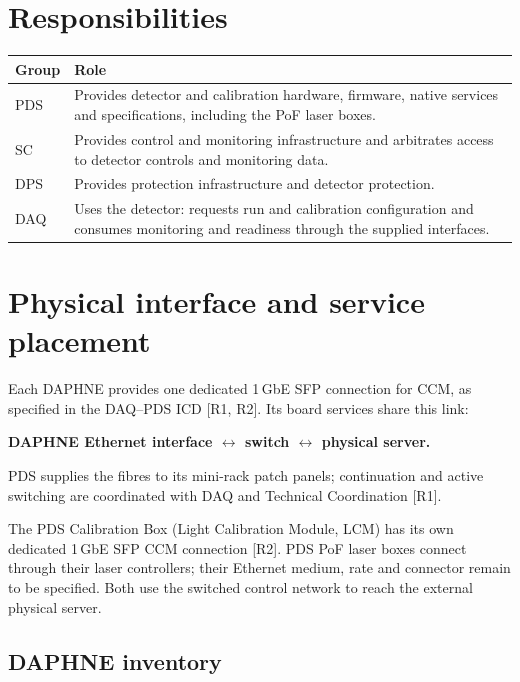 \section{Responsibilities}

\begin{center}\small
\begin{tabular}{L{0.12\textwidth}L{0.81\textwidth}}
\toprule
\textbf{Group} & \textbf{Role} \\
\midrule
PDS & Provides detector and calibration hardware, firmware, native services and specifications, including the PoF laser boxes. \\
SC & Provides control and monitoring infrastructure and arbitrates access to detector controls and monitoring data. \\
DPS & Provides protection infrastructure and detector protection. \\
DAQ & Uses the detector: requests run and calibration configuration and consumes monitoring and readiness through the supplied interfaces. \\
\bottomrule
\end{tabular}
\end{center}

\section{Physical interface and service placement}

Each DAPHNE provides one dedicated 1\,GbE SFP connection for CCM, as specified
in the DAQ--PDS ICD [R1, R2]. Its board services share this link:
\begin{center}
\textbf{DAPHNE Ethernet interface $\longleftrightarrow$ switch
$\longleftrightarrow$ physical server.}
\end{center}
PDS supplies the fibres to its mini-rack patch panels; continuation and active
switching are coordinated with DAQ and Technical Coordination [R1].

The PDS Calibration Box (Light Calibration Module, LCM) has its own dedicated
1\,GbE SFP CCM connection [R2]. PDS PoF laser boxes connect through their laser
controllers; their Ethernet medium, rate and connector remain to be specified.
Both use the switched control network to reach the external physical server.

\subsection{DAPHNE inventory}


